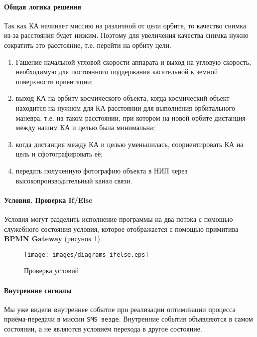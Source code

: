 \documentclass[12pt,a4paper]{article}
\begin{document}
\paragraph{Общая логика решения} 

Так как КА начинает миссию на различной от цели орбите, то качество снимка из-за расстояния будет низким. Поэтому для увеличения качества снимка нужно сократить это расстояние, т.е. перейти на орбиту цели.

\begin{enumerate}
\item Гашение начальной угловой скорости аппарата и выход на угловую скорость, необходимую для постоянного поддержания касательной к земной поверхности ориентации;
\item выход КА на орбиту космического объекта, когда космический объект находится на нужном для КА расстоянии для выполнения орбитального маневра, т.е. на таком расстоянии, при котором на новой орбите дистанция между нашим КА и целью была минимальна;
\item когда дистанция между КА и целью уменьшилась, соориентировать КА на цель и сфотографировать её;
\item передать полученную фотографию объекта в НИП через высокопроизводительный канал связи.
\end{enumerate}

\paragraph{Условия. Проверка If/Else}Условия могут разделить исполнение программы на два потока с помощью служебного состояния условия, которое отображается с помощью примитива \textbf{BPMN Gateway} (рисунок \ref{Pic:IfElse})

\begin{figure}[tbh]
  \begin{center}
    \texttt{[image: images/diagrams-ifelse.eps]}
    \caption{Проверка условий}
    \label{Pic:IfElse}
  \end{center}
\end{figure}

\paragraph{Внутренние сигналы} Мы уже видели внутреннее событие при реализации оптимизации процесса приёма-передачи в миссии \verb'SMS везде'. Внутренние события объявляются в самом состоянии, а не являются условием перехода в другое состояние.  
\end{document}
